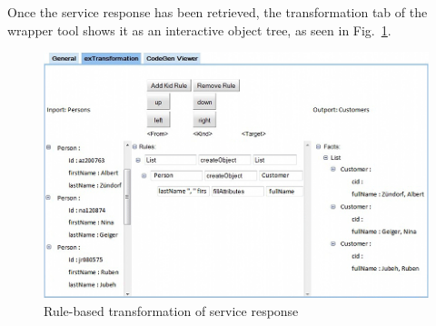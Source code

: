 % 
% 





Once the service response has been retrieved, the transformation tab of the wrapper tool shows it as an interactive object tree, as seen in Fig.~\ref{fig:response_service_execution}. 

\begin{figure}
  \begin{center}     
    \includegraphics[width=\linewidth]{images/ServiceWrapperToolGVSWithTransformationRules-small.png}
    \caption{Rule-based transformation of service response}
    \label{fig:response_service_execution}
  \end{center}
\end{figure}

